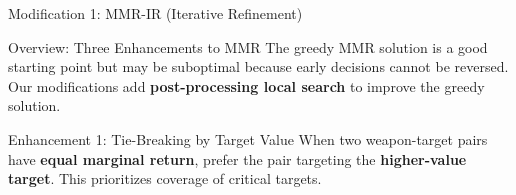 \documentclass[aspectratio=43,8pt]{beamer}
\begin{document}
\begin{frame}{Modification 1: MMR-IR (Iterative Refinement)}
\begin{block}{Overview: Three Enhancements to MMR}
The greedy MMR solution is a good starting point but may be suboptimal because early decisions cannot be reversed. Our modifications add \textbf{post-processing local search} to improve the greedy solution.
\end{block}

\vspace{0.3cm}
\begin{center}
\end{center}

\vspace{0.3cm}
\begin{exampleblock}{Enhancement 1: Tie-Breaking by Target Value}
When two weapon-target pairs have \textbf{equal marginal return}, prefer the pair targeting the \textbf{higher-value target}. This prioritizes coverage of critical targets.
\end{exampleblock}
\end{frame}
\end{document}
